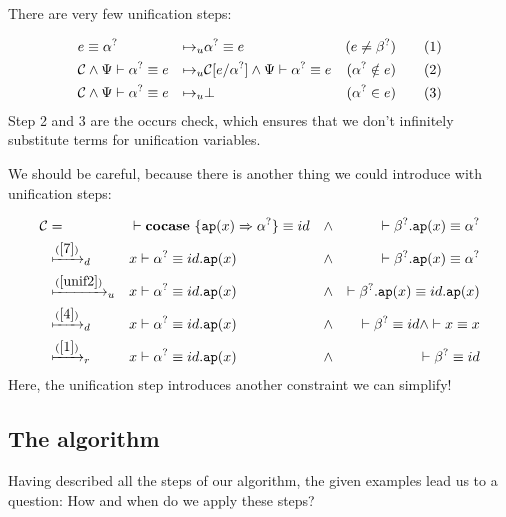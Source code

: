 \documentclass[twoside,12pt,a4paper]{article}
\begin{document}
There are very few unification steps: 
\begin{definition}[Unification]
    \begin{align*}
        & e \equiv\alpha^?
        &\mapsto_u& \alpha^? \equiv e &(e\neq \beta^?)
        \tag{1}\\
        &\mathcal{C} \wedge \Psi \vdash \alpha^? \equiv e 
        &\mapsto_u& \mathcal{C}[e/\alpha^?] \wedge \Psi \vdash \alpha^? \equiv e &(\alpha^? \notin e)
        \tag{2}\label{unif2}\\
        &\mathcal{C} \wedge \Psi \vdash \alpha^? \equiv e
        &\mapsto_u& \bot &(\alpha^?\in e)
        \tag{3}
    \end{align*}
Step 2 and 3 are the occurs check, which ensures that we don't infinitely substitute terms for unification variables.
\end{definition}

We should be careful, because there is another thing we could introduce with unification steps:
\begin{example}
    \begin{align*}
        \mathcal{C} &=& &\vdash \textbf{cocase}\ \{\texttt{ap}(x)\Rightarrow\alpha^?\}\equiv id 
        &\wedge& &\vdash \beta^?.\texttt{ap}(x)\equiv \alpha^?\\
        &\xmapsto{(\ref{7})}_d& &x \vdash \alpha^? \equiv id.\texttt{ap}(x)
        &\wedge& &\vdash \beta^?.\texttt{ap}(x)\equiv \alpha^?\\
        &\xmapsto{(\ref{unif2})}_u& &x \vdash \alpha^? \equiv id.\texttt{ap}(x)
        &\wedge& &\vdash \beta^?.\texttt{ap}(x)\equiv id.\texttt{ap}(x)\\
        &\xmapsto{(\ref{4})}_d& &x \vdash \alpha^? \equiv id.\texttt{ap}(x) 
        &\wedge& &\vdash \beta^? \equiv id \wedge \vdash x \equiv x\\
        &\xmapsto{(\ref{1})}_r& &x \vdash \alpha^? \equiv id.\texttt{ap}(x)
        &\wedge& &\vdash \beta^? \equiv id
    \end{align*}
    Here, the unification step introduces another constraint we can simplify! 
\end{example}

\subsection{The algorithm}
Having described all the steps of our algorithm, the given examples lead us to a question:
How and when do we apply these steps?
\end{document}
